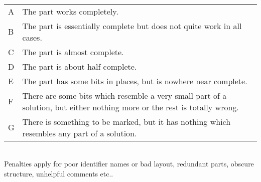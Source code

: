 \\[0.1in]
\mdseries
\small
\begin{tabular}{l p{6in}}
A & The part works completely. \\
B & The part is essentially complete but does not quite work in all cases. \\
C & The part is almost complete. \\
D & The part is about half complete. \\
E & The part has some bits in places, but is nowhere near complete. \\
F & There are some bits which resemble a very small part of a solution, but
either nothing more or the rest is totally wrong. \\
G & There is something to be marked, but it has nothing which resembles any
part of a solution. \\
\end{tabular}
\\[0.1in]
Penalties apply for poor identifier names or bad layout, redundant parts,
obscure structure, unhelpful comments etc..
\\[0.1in]

